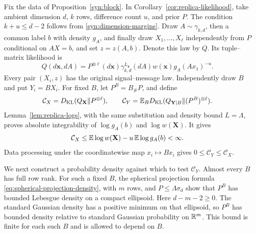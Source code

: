 Fix the data of Proposition~\ref{syn:block}.  In
Corollary~\ref{cor:replica-likelihood}, take ambient dimension \(d\),
\(k\) rows, difference count \(u\), and prior \(P\).  The condition
\(k+u\le d-2\) follows from \eqref{syn:dimension-margins}.
Draw \(A\sim\gamma_{k,d}\), then a common label \(b\) with density
\(g_A\), and finally draw
\(X_1,\ldots,X_\ell\) independently from \(P\) conditional on \(AX=b\),
and set \(z=z(A,b)\).  Denote this law by \(Q\).  Its tuple--matrix
likelihood is
\begin{equation}\label{syn:actual-replica}
 Q(d\mathbf x,dA)
 =P^{\otimes\ell}(d\mathbf x)\gamma_{k,d}^{L_{\mathbf x}}(dA)
       w(\mathbf x)g_A(Ax_1)^{-u}.
\end{equation}
Every pair \((X_i,z)\) has the original signal--message law.
Independently draw \(B\) and put \(Y_i=BX_i\).  For fixed \(B\), let
\(P^B=B_\#P\), and define
\[
 \mathcal C_X=D_{\mathrm{KL}}(Q_{\mathbf X}\Vert P^{\otimes\ell}),\qquad
 \mathcal C_Y=\mathbb E_BD_{\mathrm{KL}}(Q_{\mathbf Y\mid B}\Vert(P^B)^{\otimes\ell}).
\]
Lemma~\ref{lem:replica-logs}, with the same substitution and density
bound \(L=\Lambda\), proves absolute integrability of
\(\log g_A(b)\) and \(\log w(\mathbf X)\).  It gives
\begin{equation}\label{syn:correlation-upper}
 \mathcal C_X
 \le \mathbb E\log w(\mathbf X)-u\,\mathbb E\log g_A(b)<\infty.
\end{equation}
Data processing under the coordinatewise map \(x_i\mapsto Bx_i\) gives
\(0\le\mathcal C_Y\le\mathcal C_X\).

We next construct a probability density against which to test
\(\mathcal C_Y\).  Almost every \(B\) has full row rank.  For such a fixed
\(B\), the spherical projection formula
\eqref{eq:spherical-projection-density}, with \(m\) rows, and
\(P\le\Lambda\sigma_d\) show that \(P^B\) has bounded Lebesgue density
on a compact ellipsoid.  Here \(d-m-2\ge0\).  The standard Gaussian density
has a positive minimum on that ellipsoid, so \(P^B\) has bounded density
relative to standard Gaussian probability on \(\mathbb R^m\).  This bound is
finite for each such \(B\) and is allowed to depend on \(B\).

